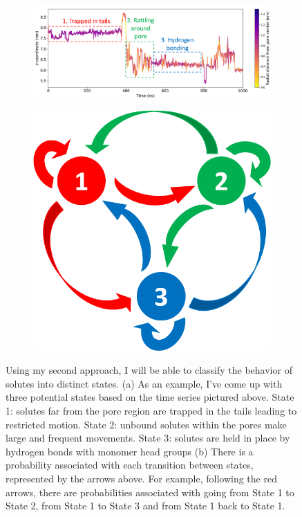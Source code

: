 \documentclass{article}
\begin{document}
  \begin{figure}
  \centering
  \vspace{-0.5cm}
  \begin{subfigure}{0.725\linewidth}
  \includegraphics[width=\linewidth]{markov_states_timeseries.png}
  \caption{}\label{fig:markov_states_timeseries}
  \end{subfigure}
  \begin{subfigure}{0.25\linewidth}
  \includegraphics[width=\linewidth]{markov.png}
  \caption{}\label{fig:markov}
  \end{subfigure}
  \caption{Using my second approach, I will be able to classify the behavior
  of solutes into distinct states. (a) As an example, I've come up with three
  potential states based on the time series pictured above. State 1: solutes
  far from the pore region are trapped in the tails leading to restricted 
  motion. State 2: unbound solutes within the pores make large and frequent
  movements. State 3: solutes are held in place by hydrogen bonds with monomer head groups
  (b) There is a probability associated with each transition between states, represented by the arrows above. For example, following
  the red arrows, there are probabilities associated with going from State 1 to
  State 2, from State 1 to State 3 and from State 1 back to State 1.
  }\label{fig:markov_states}
  \vspace{-.5cm}
  \end{figure}
  
\end{document}
